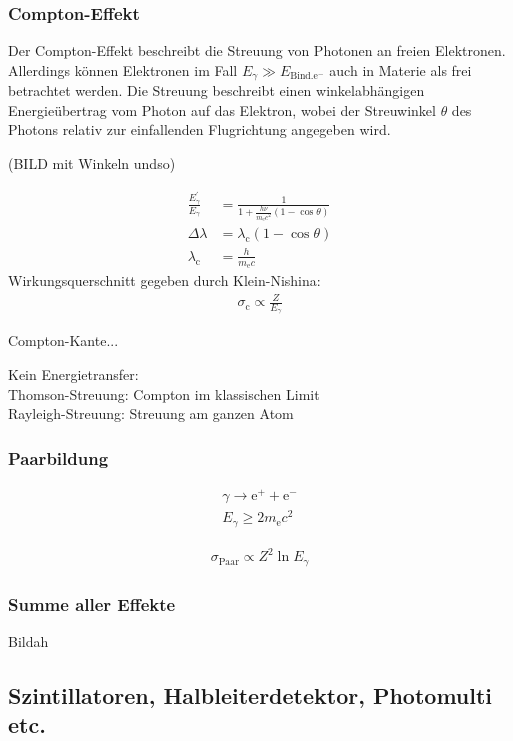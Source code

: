 \documentclass[11pt, a4paper]{article}
\numberwithin{equation}{section}
\begin{document}
\subsubsection{Compton-Effekt}
Der Compton-Effekt beschreibt die Streuung von Photonen an freien Elektronen.
Allerdings können Elektronen im Fall $E_\gamma \gg E_\mathrm{Bind. e^{-}}$ auch in Materie als frei betrachtet werden.
Die Streuung beschreibt einen winkelabhängigen Energieübertrag vom Photon auf das Elektron, wobei der Streuwinkel $\theta$ des Photons relativ zur einfallenden Flugrichtung angegeben wird.

(BILD mit Winkeln undso)

\begin{align}
	\frac{E_\gamma^\prime}{E_\gamma} &= \frac{1}{1 + \frac{h \nu}{m_\mathrm{e} c^2} (1-\cos\theta)} \\
	\Delta \lambda &= \lambda_\mathrm{c} (1 - \cos\theta) \\
	\lambda_\mathrm{c} &= \frac{h}{m_\mathrm{e} c}
\end{align}
Wirkungsquerschnitt gegeben durch Klein-Nishina:
\begin{align}
	\sigma_\mathrm{c} \propto \frac{Z}{E_\gamma}
\end{align}

Compton-Kante...

Kein Energietransfer:\\
Thomson-Streuung: Compton im klassischen Limit\\
Rayleigh-Streuung: Streuung am ganzen Atom\\


\subsubsection{Paarbildung}
\begin{align}
	\gamma \rightarrow \mathrm{e}^{+} + \mathrm{e}^{-}\\
	E_\gamma \geq 2 m_\mathrm{e} c^2
\end{align}

\begin{align}
	\sigma_\mathrm{Paar} \propto Z^2 \ln E_\gamma
\end{align}

\subsubsection{Summe aller Effekte}

Bildah

\subsection{Szintillatoren, Halbleiterdetektor, Photomulti etc.}
\end{document}
